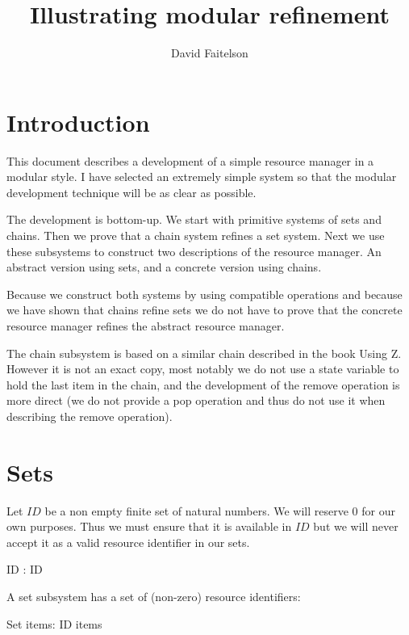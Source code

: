 \documentclass{article}
\title{Illustrating modular refinement}
\author{David Faitelson}
\begin{document}
\maketitle

\section{Introduction}

This document describes a development of a simple resource manager in a
modular style. I have selected an extremely simple system so that the
modular development technique will be as clear as possible.

The development is bottom-up. We start with primitive systems of sets
and chains. Then we prove that a chain system refines a set system. Next
we use these subsystems to construct two descriptions of the resource
manager. An abstract version using sets, and a concrete version using
chains.

Because we construct both systems by using compatible operations and
because we have shown that chains refine sets we do not have to prove
that the concrete resource manager refines the abstract resource manager.

The chain subsystem is based on a similar chain described in the book
Using Z. However it is not an exact copy, most notably we do not use a
state variable to hold the last item in the chain, and the development
of the remove operation is more direct (we do not provide a pop operation
and thus do not use it when describing the remove operation).

\section{Sets}

Let $ID$ be a non empty finite set of natural numbers. We will reserve $0$ for
our own purposes. Thus we must ensure that it is available in $ID$
but we will never accept it as a valid resource identifier in our sets.

\begin{axdef}
	ID : \finset \nat
{} \in ID 
\end{axdef}

A set subsystem has a set of (non-zero) resource identifiers:

\begin{schema}{Set}
	items: \finset ID 
 \notin items
\end{schema}
\end{document}
